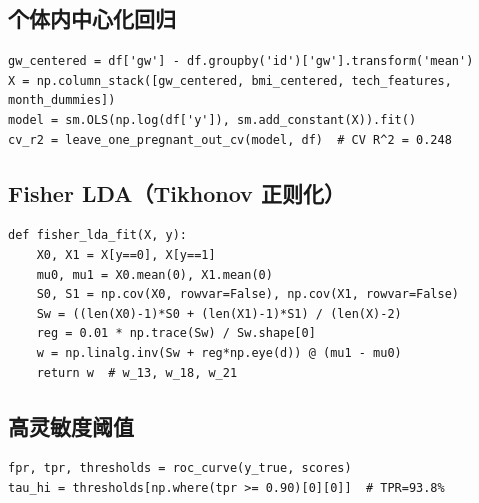 \documentclass{mcm-paper}
\begin{document}
{\footnotesize
\subsection{个体内中心化回归}
\begin{verbatim}
gw_centered = df['gw'] - df.groupby('id')['gw'].transform('mean')
X = np.column_stack([gw_centered, bmi_centered, tech_features, month_dummies])
model = sm.OLS(np.log(df['y']), sm.add_constant(X)).fit()
cv_r2 = leave_one_pregnant_out_cv(model, df)  # CV R^2 = 0.248
\end{verbatim}

\subsection{Fisher LDA（Tikhonov 正则化）}
\begin{verbatim}
def fisher_lda_fit(X, y):
    X0, X1 = X[y==0], X[y==1]
    mu0, mu1 = X0.mean(0), X1.mean(0)
    S0, S1 = np.cov(X0, rowvar=False), np.cov(X1, rowvar=False)
    Sw = ((len(X0)-1)*S0 + (len(X1)-1)*S1) / (len(X)-2)
    reg = 0.01 * np.trace(Sw) / Sw.shape[0]
    w = np.linalg.inv(Sw + reg*np.eye(d)) @ (mu1 - mu0)
    return w  # w_13, w_18, w_21
\end{verbatim}

\subsection{高灵敏度阈值}
\begin{verbatim}
fpr, tpr, thresholds = roc_curve(y_true, scores)
tau_hi = thresholds[np.where(tpr >= 0.90)[0][0]]  # TPR=93.8%
\end{verbatim}
}
\end{document}
